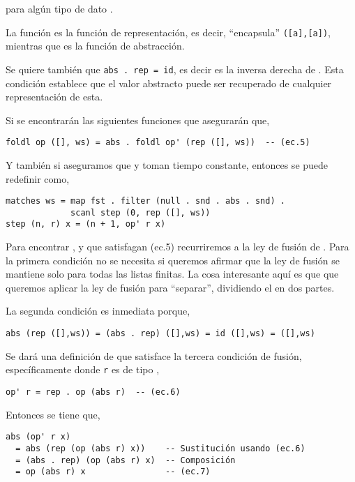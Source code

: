para algún tipo de dato .

La función  es la función de representación, es decir, ``encapsula'' \texttt{([a],[a])},
mientras que  es la función de abstracción. %

Se quiere también que \texttt{abs . rep = id}, es decir  es la inversa derecha de
. Esta condición establece que el valor abstracto puede ser recuperado de cualquier
representación de esta.

Si se encontrarán las siguientes funciones que asegurarán que,
\begin{verbatim}
foldl op ([], ws) = abs . foldl op' (rep ([], ws))  -- (ec.5)
\end{verbatim}

Y también si aseguramos que  y  toman tiempo constante, entonces se puede
redefinir  como,

\begin{verbatim}
matches ws = map fst . filter (null . snd . abs . snd) .
             scanl step (0, rep ([], ws))
step (n, r) x = (n + 1, op' r x)    
\end{verbatim}

Para encontrar ,  y  que satisfagan (ec.5) recurriremos a la ley de fusión de .
Para la primera condición no se necesita si queremos afirmar que la ley de fusión se mantiene solo para todas las listas finitas.
La cosa interesante aquí es que que queremos aplicar la ley de fusión para ``separar'', dividiendo el  en dos partes.

La segunda condición es inmediata porque,
\begin{verbatim}
abs (rep ([],ws)) = (abs . rep) ([],ws) = id ([],ws) = ([],ws)
\end{verbatim}

Se dará una definición de  que satisface la tercera condición de fusión,
específicamente donde \texttt{r} es de tipo ,
\begin{verbatim}
op' r = rep . op (abs r)  -- (ec.6)
\end{verbatim}

Entonces se tiene que,
\begin{verbatim}
abs (op' r x) 
  = abs (rep (op (abs r) x))    -- Sustitución usando (ec.6)
  = (abs . rep) (op (abs r) x)  -- Composición
  = op (abs r) x                -- (ec.7)
\end{verbatim}

